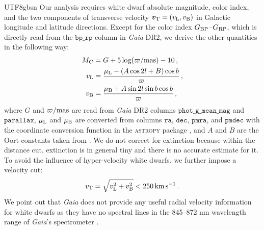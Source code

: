\documentclass[twocolumn, times, trackchanges]{aastex63_bren}
\newcommand{\vL}{v_{\rm L}}
\newcommand{\vB}{v_{\rm B}}
\newcommand{\mathbfit}{\bm}
\newcommand{\bvT}{\mathbfit{v}_{\rm T}}
\begin{document}
\begin{CJK*}{UTF8}{gbsn}
Our analysis requires white dwarf absolute magnitude, color index, and the two components of transverse velocity $\bvT=(\vL,\vB)$ in Galactic longitude and latitude directions. Except for the color index $G_{\rm BP}$--$G_{\rm RP}$, which is directly read from the $\texttt{bp\_rp}$ column in {\it Gaia} DR2, we derive the other quantities in the following way:
\begin{align}
    M_G&=G+5\log(\varpi/\rm{mas}) -10\,,\\
    \vL &= \frac{\mu_{\rm L}-(A\cos 2l + B )\cos b}{\varpi}\,,\\
    \vB &= \frac{\mu_{\rm B}+A\sin 2l \sin b \cos b}{\varpi}\,,
\end{align}
where $G$ and $\varpi/\rm{mas}$ are read from {\it Gaia} DR2 columns  $\texttt{phot\_g\_mean\_mag}$ and $\texttt{parallax}$, $\mu_{\rm L}$ and $\mu_{\rm B}$ are converted from columns $\texttt{ra}$, $\texttt{dec}$, $\texttt{pmra}$, and $\texttt{pmdec}$ with the coordinate conversion function in the \textsc{astropy} package \citep{AstropyCollaboration_2013, AstropyCollaboration_2018}, and $A$ and $B$ are the Oort constants taken from \citet{Bovy_2017}. We do not correct for extinction because within the distance cut, extinction is in general tiny and there is no accurate estimate for it. To avoid the influence of hyper-velocity white dwarfs, we further impose a velocity cut:
\begin{align}
\label{eq:vT_cut}
    v_{\rm T}=\sqrt{\vL^2+\vB^2} < 250 {\rm\,km\,s^{-1}}\,.
\end{align}
We point out that {\it Gaia} does not provide any useful radial velocity information for white dwarfs as they have no spectral lines in the 845--872 nm wavelength range of {\it Gaia}'s spectrometer \citep{GaiaCollaboration_2016}.


\end{CJK*}
\end{document}
